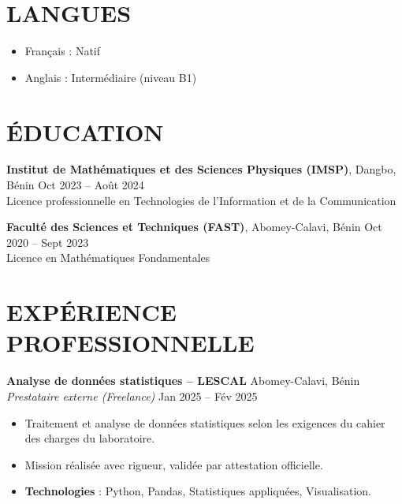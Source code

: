 \documentclass[a4paper,9pt]{extarticle}
\begin{document}
\section*{LANGUES}
\begin{itemize}
    \item Fran\c{c}ais : Natif
    \item Anglais : Interm\'ediaire (niveau B1)
\end{itemize}

\section*{\'EDUCATION}

{%
\noindent
\textbf{Institut de Math\'ematiques et des Sciences Physiques (IMSP)}, Dangbo, B\'enin \hfill Oct 2023 -- Ao\^ut 2024\\
Licence professionnelle en Technologies de l\textquoteright{}Information et de la Communication


\noindent
\textbf{Facult\'e des Sciences et Techniques (FAST)}, Abomey-Calavi, B\'enin \hfill Oct 2020 -- Sept 2023\\
Licence en Math\'ematiques Fondamentales

\section*{EXP\'ERIENCE PROFESSIONNELLE}
\textbf{Analyse de donn\'ees statistiques -- LESCAL} \hfill Abomey-Calavi, B\'enin\\
\textit{Prestataire externe (Freelance)} \hfill Jan 2025 -- F\'ev 2025
\begin{itemize}
    \item Traitement et analyse de donn\'ees statistiques selon les exigences du cahier des charges du laboratoire.
    \item Mission r\'ealis\'ee avec rigueur, valid\'ee par attestation officielle.
    \item \textbf{Technologies} : Python, Pandas, Statistiques appliqu\'ees, Visualisation.
\end{itemize}

}
\end{document}
